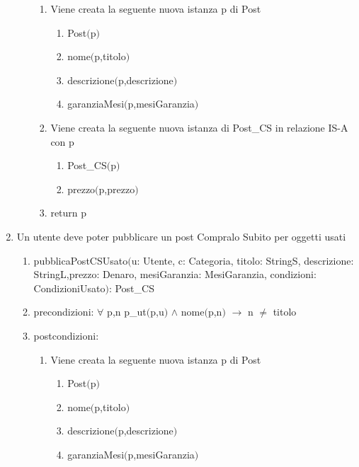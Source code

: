 \documentclass{article}
\begin{document}
\begin{enumerate}
\begin{enumerate}
        \begin{enumerate}
            \item Viene creata la seguente nuova istanza p di Post
            \begin{enumerate}
                \item Post$($p$)$
                \item nome$($p,titolo$)$
                \item descrizione$($p,descrizione$)$
                \item garanziaMesi$($p,mesiGaranzia$)$
            \end{enumerate}
            \item Viene creata la seguente nuova istanza di Post\_CS in relazione IS-A con p
            \begin{enumerate}
                \item Post\_CS$($p$)$
                \item prezzo$($p,prezzo$)$
            \end{enumerate}
            \item return p
        \end{enumerate}
    \end{enumerate}
    \item Un utente deve poter pubblicare un post Compralo Subito per oggetti usati
    \begin{enumerate}
        \item pubblicaPostCSUsato$($u: Utente, c: Categoria, titolo: StringS, descrizione: StringL,\newline prezzo: Denaro, mesiGaranzia: MesiGaranzia, condizioni: CondizioniUsato$)$: Post\_CS
        \item precondizioni: $\forall$ p,n p\_ut$($p,u$)$ $\land$ nome$($p,n$)$ $\rightarrow$ n $\neq$ titolo
        \item postcondizioni:
        \begin{enumerate}
            \item Viene creata la seguente nuova istanza p di Post
            \begin{enumerate}
                \item Post$($p$)$
                \item nome$($p,titolo$)$
                \item descrizione$($p,descrizione$)$
                \item garanziaMesi$($p,mesiGaranzia$)$
            \end{enumerate}

\end{enumerate}
\end{enumerate}
\end{enumerate}
\end{document}
